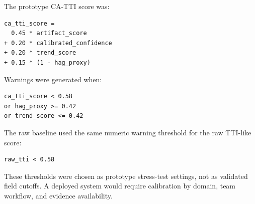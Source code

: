 \documentclass[11pt]{article}
\begin{document}
The prototype CA-TTI score was:
\begin{Verbatim}[fontsize=\small]
ca_tti_score =
  0.45 * artifact_score
+ 0.20 * calibrated_confidence
+ 0.20 * trend_score
+ 0.15 * (1 - hag_proxy)
\end{Verbatim}
Warnings were generated when:
\begin{Verbatim}[fontsize=\small]
ca_tti_score < 0.58
or hag_proxy >= 0.42
or trend_score <= 0.42
\end{Verbatim}
The raw baseline used the same numeric warning threshold for the raw TTI-like score:
\begin{Verbatim}[fontsize=\small]
raw_tti < 0.58
\end{Verbatim}
These thresholds were chosen as prototype stress-test settings, not as validated field cutoffs. A deployed system would require calibration by domain, team workflow, and evidence availability.
\end{document}
